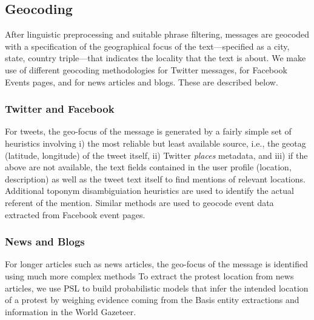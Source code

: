 \vspace{-0.5em}
\subsection{Geocoding}
\label{subsection:geocoding}
After linguistic preprocessing and suitable phrase filtering,
messages are geocoded with a
specification of the geographical focus of the text---specified as a
city, state, country triple---that indicates the locality that the
text is about. We make use of different geocoding methodologies
for Twitter messages, for Facebook Events pages, and for news articles and blogs.
These are described below.

\subsubsection{Twitter and Facebook}
For tweets, the geo-focus of the message is generated by a fairly
simple set of heuristics involving i)
the most reliable but least
available source, i.e., the geotag (latitude, longitude) of the tweet itself,
ii) Twitter {\it places} metadata, and iii) if the above are not
available, the text fields 
contained in
the user profile (location, description) as well as the tweet text
itself to find mentions of relevant locations.  Additional toponym disambiguiation heuristics are used to
identify the actual referent of the mention.
Similar methods are used to geocode event data extracted from 
Facebook event pages.  

\subsubsection{News and Blogs}
For longer articles such as news articles, the geo-focus of the message is identified using much more complex methods
To extract the protest location from news articles, we use PSL to build probabilistic models that infer the intended
location of a protest by 
weighing evidence coming from the Basis entity extractions and information in the World Gazeteer. 

